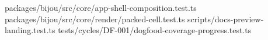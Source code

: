 \begin{itemize}
\allowbreak{}p\allowbreak{}a\allowbreak{}c\allowbreak{}k\allowbreak{}a\allowbreak{}g\allowbreak{}e\allowbreak{}s\allowbreak{}/\allowbreak{}b\allowbreak{}i\allowbreak{}j\allowbreak{}o\allowbreak{}u\allowbreak{}/\allowbreak{}s\allowbreak{}r\allowbreak{}c\allowbreak{}/\allowbreak{}c\allowbreak{}o\allowbreak{}r\allowbreak{}e\allowbreak{}/\allowbreak{}a\allowbreak{}p\allowbreak{}p\allowbreak{}-\allowbreak{}s\allowbreak{}h\allowbreak{}e\allowbreak{}l\allowbreak{}l\allowbreak{}-\allowbreak{}c\allowbreak{}o\allowbreak{}m\allowbreak{}p\allowbreak{}o\allowbreak{}s\allowbreak{}i\allowbreak{}t\allowbreak{}i\allowbreak{}o\allowbreak{}n\allowbreak{}.\allowbreak{}t\allowbreak{}e\allowbreak{}s\allowbreak{}t\allowbreak{}.\allowbreak{}t\allowbreak{}s\allowbreak{} \allowbreak{}p\allowbreak{}a\allowbreak{}c\allowbreak{}k\allowbreak{}a\allowbreak{}g\allowbreak{}e\allowbreak{}s\allowbreak{}/\allowbreak{}b\allowbreak{}i\allowbreak{}j\allowbreak{}o\allowbreak{}u\allowbreak{}/\allowbreak{}s\allowbreak{}r\allowbreak{}c\allowbreak{}/\allowbreak{}c\allowbreak{}o\allowbreak{}r\allowbreak{}e\allowbreak{}/\allowbreak{}r\allowbreak{}e\allowbreak{}n\allowbreak{}d\allowbreak{}e\allowbreak{}r\allowbreak{}/\allowbreak{}p\allowbreak{}a\allowbreak{}c\allowbreak{}k\allowbreak{}e\allowbreak{}d\allowbreak{}-\allowbreak{}c\allowbreak{}e\allowbreak{}l\allowbreak{}l\allowbreak{}.\allowbreak{}t\allowbreak{}e\allowbreak{}s\allowbreak{}t\allowbreak{}.\allowbreak{}t\allowbreak{}s\allowbreak{} \allowbreak{}s\allowbreak{}c\allowbreak{}r\allowbreak{}i\allowbreak{}p\allowbreak{}t\allowbreak{}s\allowbreak{}/\allowbreak{}d\allowbreak{}o\allowbreak{}c\allowbreak{}s\allowbreak{}-\allowbreak{}p\allowbreak{}r\allowbreak{}e\allowbreak{}v\allowbreak{}i\allowbreak{}e\allowbreak{}w\allowbreak{}-\allowbreak{}l\allowbreak{}a\allowbreak{}n\allowbreak{}d\allowbreak{}i\allowbreak{}n\allowbreak{}g\allowbreak{}.\allowbreak{}t\allowbreak{}e\allowbreak{}s\allowbreak{}t\allowbreak{}.\allowbreak{}t\allowbreak{}s\allowbreak{} \allowbreak{}t\allowbreak{}e\allowbreak{}s\allowbreak{}t\allowbreak{}s\allowbreak{}/\allowbreak{}c\allowbreak{}y\allowbreak{}c\allowbreak{}l\allowbreak{}e\allowbreak{}s\allowbreak{}/\allowbreak{}D\allowbreak{}F\allowbreak{}-\allowbreak{}0\allowbreak{}0\allowbreak{}1\allowbreak{}/\allowbreak{}d\allowbreak{}o\allowbreak{}g\allowbreak{}f\allowbreak{}o\allowbreak{}o\allowbreak{}d\allowbreak{}-\allowbreak{}c\allowbreak{}o\allowbreak{}v\allowbreak{}e\allowbreak{}r\allowbreak{}a\allowbreak{}g\allowbreak{}e\allowbreak{}-\allowbreak{}p\allowbreak{}r\allowbreak{}o\allowbreak{}g\allowbreak{}r\allowbreak{}e\allowbreak{}s\allowbreak{}s\allowbreak{}.\allowbreak{}t\allowbreak{}e\allowbreak{}s\allowbreak{}t\allowbreak{}.\allowbreak{}t\allowbreak{}s\allowbreak{} 
\end{itemize}
